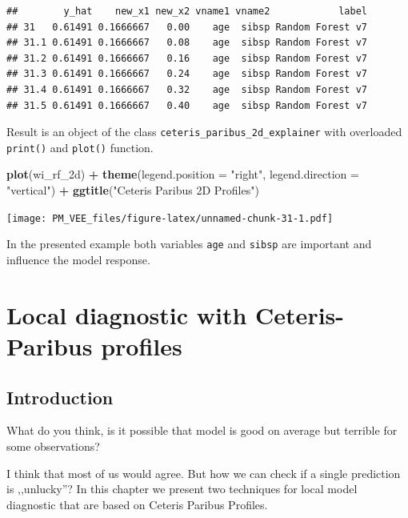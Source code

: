 \documentclass[12pt,]{krantz}
\newenvironment{Shaded}{\begin{snugshade}}{\end{snugshade}}
\newcommand{\DataTypeTok}[1]{\textcolor[rgb]{0.13,0.29,0.53}{#1}}
\newcommand{\KeywordTok}[1]{\textcolor[rgb]{0.13,0.29,0.53}{\textbf{#1}}}
\newcommand{\NormalTok}[1]{#1}
\newcommand{\OperatorTok}[1]{\textcolor[rgb]{0.81,0.36,0.00}{\textbf{#1}}}
\newcommand{\StringTok}[1]{\textcolor[rgb]{0.31,0.60,0.02}{#1}}
\theoremstyle{definition}
\theoremstyle{definition}
\theoremstyle{definition}
\theoremstyle{remark}
\begin{document}
\begin{verbatim}
##        y_hat    new_x1 new_x2 vname1 vname2            label
## 31   0.61491 0.1666667   0.00    age  sibsp Random Forest v7
## 31.1 0.61491 0.1666667   0.08    age  sibsp Random Forest v7
## 31.2 0.61491 0.1666667   0.16    age  sibsp Random Forest v7
## 31.3 0.61491 0.1666667   0.24    age  sibsp Random Forest v7
## 31.4 0.61491 0.1666667   0.32    age  sibsp Random Forest v7
## 31.5 0.61491 0.1666667   0.40    age  sibsp Random Forest v7
\end{verbatim}

Result is an object of the class
\texttt{ceteris\_paribus\_2d\_explainer} with overloaded
\texttt{print()} and \texttt{plot()} function.

\begin{Shaded}
\begin{Highlighting}[]
\KeywordTok{plot}\NormalTok{(wi_rf_2d) }\OperatorTok{+}\StringTok{ }
\StringTok{  }\KeywordTok{theme}\NormalTok{(}\DataTypeTok{legend.position =} \StringTok{"right"}\NormalTok{, }\DataTypeTok{legend.direction =} \StringTok{"vertical"}\NormalTok{) }\OperatorTok{+}\StringTok{ }\KeywordTok{ggtitle}\NormalTok{(}\StringTok{"Ceteris Paribus 2D Profiles"}\NormalTok{)}
\end{Highlighting}
\end{Shaded}

\texttt{[image: PM\_VEE\_files/figure-latex/unnamed-chunk-31-1.pdf]}

In the presented example both variables \texttt{age} and \texttt{sibsp}
are important and influence the model response.

\hypertarget{ceterisParibusWankardu}{%
\section{Local diagnostic with Ceteris-Paribus
profiles}\label{ceterisParibusWankardu}}

\hypertarget{introduction-4}{%
\subsection{Introduction}\label{introduction-4}}

What do you think, is it possible that model is good on average but
terrible for some observations?

I think that most of us would agree. But how we can check if a single
prediction is ,,unlucky''? In this chapter we present two techniques for
local model diagnostic that are based on Ceteris Paribus Profiles.
\end{document}
